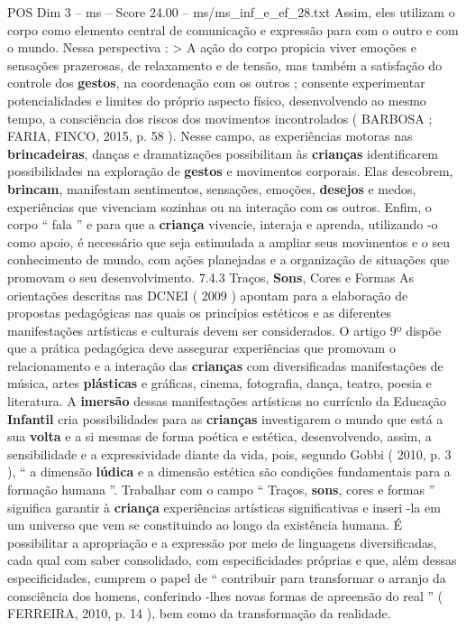 \begin{textsample}{POS Dim 3 – ms – Score 24.00 – ms/ms\_inf\_e\_ef\_28.txt}
Assim, eles utilizam o corpo como elemento central de comunicação e expressão para com o outro e com o mundo.
Nessa perspectiva : > A ação do corpo propicia viver emoções e sensações prazerosas, de relaxamento e de tensão, mas também a satisfação do controle dos \textbf{gestos}, na coordenação com os outros ; consente experimentar potencialidades e limites do próprio aspecto físico, desenvolvendo ao mesmo tempo, a consciência dos riscos dos movimentos incontrolados ( BARBOSA ; FARIA, FINCO, 2015, p. 58 ).
Nesse campo, as experiências motoras nas \textbf{brincadeiras}, danças e dramatizações possibilitam às \textbf{crianças} identificarem possibilidades na exploração de \textbf{gestos} e movimentos corporais.
Elas descobrem, \textbf{brincam}, manifestam sentimentos, sensações, emoções, \textbf{desejos} e medos, experiências que vivenciam sozinhas ou na interação com os outros.
Enfim, o corpo “ fala ” e para que a \textbf{criança} vivencie, interaja e aprenda, utilizando -o como apoio, é necessário que seja estimulada a ampliar seus movimentos e o seu conhecimento de mundo, com ações planejadas e a organização de situações que promovam o seu desenvolvimento. 7.4.3 Traços, \textbf{Sons}, Cores e Formas As orientações descritas nas DCNEI ( 2009 ) apontam para a elaboração de propostas pedagógicas nas quais os princípios estéticos e as diferentes manifestações artísticas e culturais devem ser considerados.
O artigo 9º dispõe que a prática pedagógica deve assegurar experiências que promovam o relacionamento e a interação das \textbf{crianças} com diversificadas manifestações de música, artes \textbf{plásticas} e gráficas, cinema, fotografia, dança, teatro, poesia e literatura.
A \textbf{imersão} dessas manifestações artísticas no currículo da Educação \textbf{Infantil} cria possibilidades para as \textbf{crianças} investigarem o mundo que está a sua \textbf{volta} e a si mesmas de forma poética e estética, desenvolvendo, assim, a sensibilidade e a expressividade diante da vida, pois, segundo Gobbi ( 2010, p. 3 ), “ a dimensão \textbf{lúdica} e a dimensão estética são condições fundamentais para a formação humana ”.
Trabalhar com o campo “ Traços, \textbf{sons}, cores e formas ” significa garantir à \textbf{criança} experiências artísticas significativas e inseri -la em um universo que vem se constituindo ao longo da existência humana.
É possibilitar a apropriação e a expressão por meio de linguagens diversificadas, cada qual com saber consolidado, com especificidades próprias e que, além dessas especificidades, cumprem o papel de “ contribuir para transformar o arranjo da consciência dos homens, conferindo -lhes novas formas de apreensão do real ” ( FERREIRA, 2010, p. 14 ), bem como da transformação da realidade.

\end{textsample}
